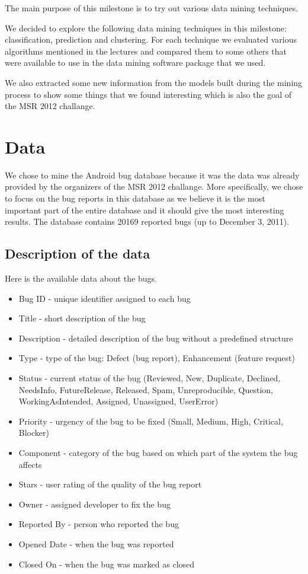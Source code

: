 The main purpose of this milestone is to try out various data mining techniques.

We decided to explore the following data mining techniques in this milestone: classification, prediction and clustering. For each technique we evaluated various algorithms mentioned in the lectures and compared them to some others that were available to use in the data mining software package that we used. 

We also extracted some new information from the models built during the mining process to show some things that we found interesting which is also the goal of the MSR 2012 challange.

\section{Data} %
\label{sub:Data}
We chose to mine the Android bug database because it was the data was already provided by the organizers of the MSR 2012 challange. More specifically, we chose to focus on the bug reports in this database as we believe it is the most important part of the entire database and it should give the most interesting results. The database contains 20169 reported bugs (up to December 3, 2011). 

\subsection*{Description of the data} %
\label{sub:Description of the data}

Here is the available data about the bugs.

\begin{itemize}
\item Bug ID - unique identifier assigned to each bug
\item Title - short description of the bug
\item Description - detailed description of the bug without a predefined structure
\item Type - type of the bug: Defect (bug report), Enhancement (feature request)
\item Status - current status of the bug (Reviewed, New, Duplicate, Declined, NeedsInfo, FutureRelease, Released, Spam, Unreproducible, Question, WorkingAsIntended, Assigned, Unassigned, UserError)
\item Priority - urgency of the bug to be fixed (Small, Medium, High, Critical, Blocker)
\item Component - category of the bug based on which part of the system the bug affects
\item Stars - user rating of the quality of the bug report
\item Owner - assigned developer to fix  the bug
\item Reported By - person who reported the bug
\item Opened Date - when the bug was reported
\item Closed On - when the bug was marked as closed
\end{itemize}

